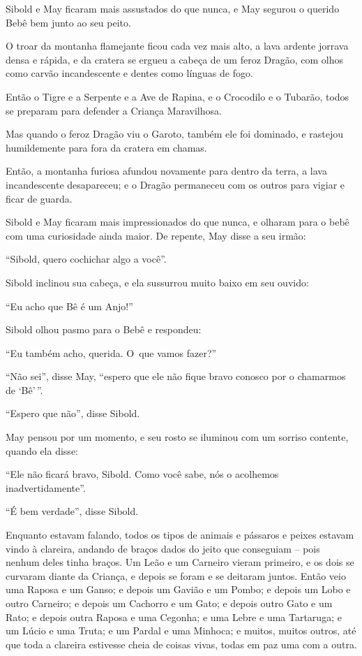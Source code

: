 Sibold e May ficaram mais assustados do que nunca, e May segurou o
querido Bebê bem junto ao seu peito.

O troar da montanha flamejante ficou cada vez mais alto, a lava ardente
jorrava densa e rápida, e da cratera se ergueu a cabeça de um feroz
Dragão, com olhos como carvão incandescente e dentes como línguas de
fogo.

Então o Tigre e a Serpente e a Ave de Rapina, e o Crocodilo e o Tubarão,
todos se preparam para defender a Criança Maravilhosa.

Mas quando o feroz Dragão viu o Garoto, também ele foi dominado, e
rastejou humildemente para fora da cratera em chamas.

Então, a montanha furiosa afundou novamente para dentro da terra, a lava
incandescente desapareceu; e o Dragão permaneceu com os outros para
vigiar e ficar de guarda.

Sibold e May ficaram mais impressionados do que nunca, e olharam para o
bebê com uma curiosidade ainda maior. De repente, May disse a seu irmão:

``Sibold, quero cochichar algo a você''.

Sibold inclinou sua cabeça, e ela sussurrou muito baixo em seu ouvido:

``Eu acho que Bê é um Anjo!''

Sibold olhou pasmo para o Bebê e respondeu:

``Eu também acho, querida. O~que vamos fazer?''

``Não sei'', disse May, ``espero que ele não fique bravo conosco por o
chamarmos de `Bê'\,''.

``Espero que não'', disse Sibold.

May pensou por um momento, e seu rosto se iluminou com um sorriso
contente, quando ela disse:

``Ele não ficará bravo, Sibold. Como você sabe, nós o acolhemos
inadvertidamente''.

``É bem verdade'', disse Sibold.

Enquanto estavam falando, todos os tipos de animais e pássaros e peixes
estavam vindo à clareira, andando de braços dados do jeito que
conseguiam -- pois nenhum deles tinha braços. Um Leão e um Carneiro
vieram primeiro, e os dois se curvaram diante da Criança, e depois se
foram e se deitaram juntos. Então veio uma Raposa e um Ganso; e depois
um Gavião e um Pombo; e depois um Lobo e outro Carneiro; e depois um
Cachorro e um Gato; e depois outro Gato e um Rato; e depois outra Raposa
e uma Cegonha; e uma Lebre e uma Tartaruga; e um Lúcio e uma Truta; e um
Pardal e uma Minhoca; e muitos, muitos outros, até que toda a clareira
estivesse cheia de coisas vivas, todas em paz uma com a outra.

